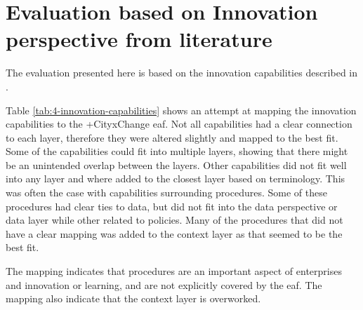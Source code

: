 \section{Evaluation based on Innovation perspective from literature}
The evaluation presented here is based on the innovation capabilities described in \cite{louw2017architecting}.

Table \ref{tab:4-innovation-capabilities} shows an attempt at mapping the innovation capabilities to the +CityxChange \gls{eaf}. Not all capabilities had a clear connection to each layer, therefore they were altered slightly and mapped to the best fit. Some of the capabilities could fit into multiple layers, showing that there might be an unintended overlap between the layers. Other capabilities did not fit well into any layer and where added to the closest layer based on terminology. This was often the case with capabilities surrounding procedures. Some of these procedures had clear ties to data, but did not fit into the data perspective or data layer while other related to policies. Many of the procedures that did not have a clear mapping was added to the context layer as that seemed to be the best fit. 

The mapping indicates that procedures are an important aspect of enterprises and innovation or learning, and are not explicitly covered by the \gls{eaf}. The mapping also indicate that the context layer is overworked. 